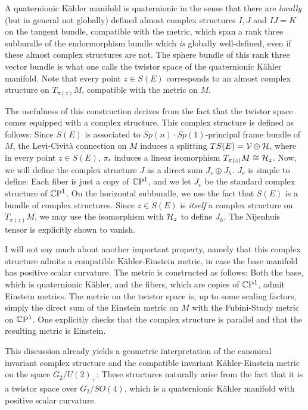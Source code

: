 \documentclass[parskip=half]{scrartcl}
\begin{document}
A quaternionic K\"ahler manifold is quaternionic in the sense that there are \emph{locally} (but in general not globally) defined almost complex structures $I,J$ and $IJ=K$ on the tangent bundle, compatible with the metric, which span a rank three subbundle of the endormorphism bundle which \emph{is} globally well-defined, even if these almost complex structures are not. The sphere bundle of this rank three vector bundle is what one calls the twistor space of the quaternionic K\"ahler manifold. Note that every point $z\in S(E)$ corresponds to an almost complex structure on $T_{\pi(z)}M$, compatible with the metric on $M$.

The usefulness of this construction derives from the fact that the twistor space comes equipped with a complex structure. This complex structure is defined as follows: Since $S(E)$ is associated to $Sp(n)\cdot Sp(1)$-principal frame bundle of $M$, the Levi-Civit\`a connection on $M$ induces a splitting $TS(E)=\mathcal{V}\oplus \mathcal{H}$, where in every point $z\in S(E)$, $\pi_*$ induces a linear isomorphism $T_{\pi(z)}M\cong \mathcal{H}_z$. Now, we will define the complex structure $J$ as a direct sum $J_v\oplus J_h$. $J_v$ is simple to define: Each fiber is just a copy of $\mathbb{C}\mathrm{P}^1$, and we let $J_v$ be the standard complex structure of $\mathbb{C}\mathrm{P}^1$. On the horizontal subbundle, we use the fact that $S(E)$ is a bundle of complex structures. Since $z\in S(E)$ is \emph{itself} a complex structure on $T_{\pi(z)}M$, we may use the isomorphism with $\mathcal{H}_z$ to define $J_h$. The Nijenhuis tensor is explicitly shown to vanish. 

I will not say much about another important property, namely that this complex structure admits a compatible K\"ahler-Einstein metric, in case the base manifold has positive scalar curvature. The metric is constructed as follows: Both the base, which is quaternionic K\"ahler, and the fibers, which are copies of $\mathbb{C}\mathrm{P}^1$, admit Einstein metrics. The metric on the twistor space is, up to some scaling factors, simply the direct sum of the Einstein metric on $M$ with the Fubini-Study metric on $\mathbb{C}\mathrm{P}^1$. One explicitly checks that the complex structure is parallel and that the resulting metric is Einstein.

This discussion already yields a geometric interpretation of the canonical invariant complex structure and the compatible invariant K\"ahler-Einstein metric on the space $G_2/U(2)_+$: These structures naturally arise from the fact that it is a twistor space over $G_2/SO(4)$, which is a quaternionic K\"ahler manifold with positive scalar curvature.
\end{document}
